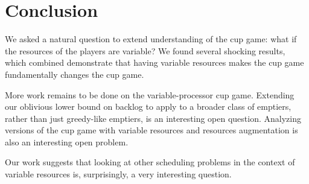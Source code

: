\section{Conclusion}

We asked a natural question to extend understanding of the cup
game: what if the resources of the players are variable?
We found several shocking results, which combined demonstrate
that having variable resources makes the cup game fundamentally
changes the cup game.

More work remains to be done on the variable-processor cup game.
Extending our oblivious lower bound on backlog to apply to a
broader class of emptiers, rather than just greedy-like emptiers,
is an interesting open question. Analyzing versions of the cup
game with variable resources and resources augmentation is also
an interesting open problem.

Our work suggests that looking at other scheduling problems in
the context of variable resources is, surprisingly, a very
interesting question.

